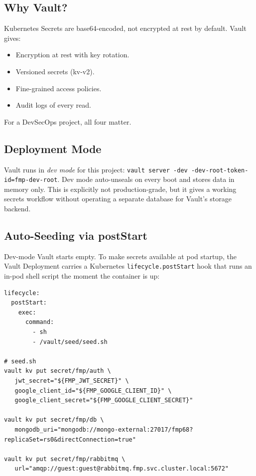\documentclass[11pt,a4paper]{article}
\begin{document}
\subsection{Why Vault?}
Kubernetes Secrets are base64-encoded, not encrypted at rest by
default.  Vault gives:

\begin{itemize}[leftmargin=*]
  \item Encryption at rest with key rotation.
  \item Versioned secrets (kv-v2).
  \item Fine-grained access policies.
  \item Audit logs of every read.
\end{itemize}

For a DevSecOps project, all four matter.

\subsection{Deployment Mode}
Vault runs in \emph{dev mode} for this project:
\texttt{vault server -dev -dev-root-token-id=fmp-dev-root}.  Dev mode
auto-unseals on every boot and stores data in memory only.  This is
explicitly not production-grade, but it gives a working secrets
workflow without operating a separate database for Vault's storage
backend.

\subsection{Auto-Seeding via postStart}
Dev-mode Vault starts empty.  To make secrets available at pod
startup, the Vault Deployment carries a Kubernetes
\texttt{lifecycle.postStart} hook that runs an in-pod shell script
the moment the container is up:

\begin{lstlisting}[caption={Vault auto-seed (paraphrased).}]
lifecycle:
  postStart:
    exec:
      command:
        - sh
        - /vault/seed/seed.sh

# seed.sh
vault kv put secret/fmp/auth \
   jwt_secret="${FMP_JWT_SECRET}" \
   google_client_id="${FMP_GOOGLE_CLIENT_ID}" \
   google_client_secret="${FMP_GOOGLE_CLIENT_SECRET}"

vault kv put secret/fmp/db \
   mongodb_uri="mongodb://mongo-external:27017/fmp68?replicaSet=rs0&directConnection=true"

vault kv put secret/fmp/rabbitmq \
   url="amqp://guest:guest@rabbitmq.fmp.svc.cluster.local:5672"
\end{lstlisting}
\end{document}
